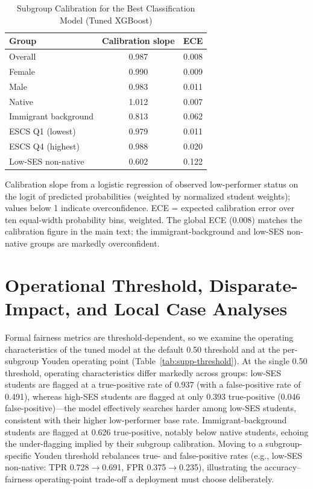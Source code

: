 \documentclass[journal]{IEEEtran}
\begin{document}
\begin{table}[!t]
\centering
\caption{Subgroup Calibration for the Best Classification Model (Tuned XGBoost)}
\label{tab:supp-calibration}
\footnotesize
\begin{tabular}{lcc}
\toprule
Group & Calibration slope & ECE \\
\midrule
Overall & 0.987 & 0.008 \\
Female & 0.990 & 0.009 \\
Male & 0.983 & 0.011 \\
Native & 1.012 & 0.007 \\
Immigrant background & 0.813 & 0.062 \\
ESCS Q1 (lowest) & 0.979 & 0.011 \\
ESCS Q4 (highest) & 0.988 & 0.020 \\
Low-SES non-native & 0.602 & 0.122 \\
\bottomrule
\end{tabular}
\vspace{2pt}
{\footnotesize Calibration slope from a logistic regression of observed low-performer status on the logit of predicted probabilities (weighted by normalized student weights); values below 1 indicate overconfidence. ECE = expected calibration error over ten equal-width probability bins, weighted. The global ECE (0.008) matches the calibration figure in the main text; the immigrant-background and low-SES non-native groups are markedly overconfident.}
\end{table}

\section{Operational Threshold, Disparate-Impact, and Local Case Analyses}
\label{sec:s7}

Formal fairness metrics are threshold-dependent, so we examine the operating characteristics of the tuned model at the default 0.50 threshold and at the per-subgroup Youden operating point (Table~\ref{tab:supp-threshold}). At the single 0.50 threshold, operating characteristics differ markedly across groups: low-SES students are flagged at a true-positive rate of 0.937 (with a false-positive rate of 0.491), whereas high-SES students are flagged at only 0.393 true-positive (0.046 false-positive)---the model effectively searches harder among low-SES students, consistent with their higher low-performer base rate. Immigrant-background students are flagged at 0.626 true-positive, notably below native students, echoing the under-flagging implied by their subgroup calibration. Moving to a subgroup-specific Youden threshold rebalances true- and false-positive rates (e.g., low-SES non-native: TPR 0.728$\to$0.691, FPR 0.375$\to$0.235), illustrating the accuracy--fairness operating-point trade-off a deployment must choose deliberately.
\end{document}
